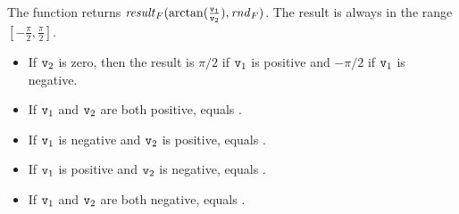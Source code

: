 The function returns $\mathit{result}_F(\arctan(\frac{{\tt{\sl v}}_1}{{\tt{\sl v}}_2}),\mathit{rnd}_F)$.
The result is always in the range $[-\frac{\pi}{2},\frac{\pi}{2}]$.
\begin{itemize}
\item If ${\tt{\sl v}}_2$ is zero, then the result is $\pi/2$ if $\TZ{v}_1$ is positive and $-\pi/2$ if
$\TZ{v}_1$ is negative.
\item If $\TZ{v}_1$ and ${\tt{\sl v}}_2$ are both positive,
 equals .
\item If $\TZ{v}_1$ is negative and ${\tt{\sl v}}_2$ is positive,
 equals .
\item If $\TZ{v}_1$ is positive and ${\tt{\sl v}}_2$ is negative,
 equals .
\item If $\TZ{v}_1$ and ${\tt{\sl v}}_2$ are both negative,
 equals .
\end{itemize}


\iffalse
\subsection{\T{atanh/1}}

\label{section:math:atanh1}
\index{math:atanh/1 function@\T{math:atanh/1} function|(}
\index{atanh/1 function of math library@\T{atanh/1} function of \T{math} library|(}

Computes the \I{hyperbolic arctangent} function.

\TYPE

\T{atanh(num()) -> float()}.

\EXITS

\T{atanh/1} exits with cause \T{badarg} if $\TZ{v}_1$ is not a number.

\EVALUATION

The function returns $\mathit{result}_F(\arctanh(\TZ{v}_1),\mathit{rnd}_F)$.
\index{math:atanh/1 function@\T{math:atanh/1} function|)}
\index{atanh/1 function of math library@\T{atanh/1} function of \T{math} library|)}
\fi


\subsection{}

